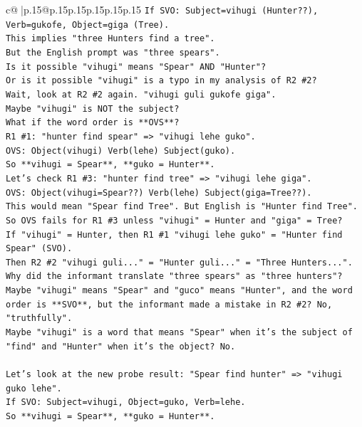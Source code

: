 \documentclass{article}
\begin{document}
{\begin{supertabular}{c@{$\;$}|p{.15\linewidth}@{}p{.15\linewidth}p{.15\linewidth}p{.15\linewidth}p{.15\linewidth}p{.15\linewidth}}
{{{\texttt{If SVO: Subject=vihugi (Hunter??), Verb=gukofe, Object=giga (Tree).} \\
\texttt{This implies "three Hunters find a tree".} \\
\texttt{But the English prompt was "three spears".} \\
\texttt{Is it possible "vihugi" means "Spear" AND "Hunter"?} \\
\texttt{Or is it possible "vihugi" is a typo in my analysis of R2 \#2?} \\
\texttt{Wait, look at R2 \#2 again. "vihugi guli gukofe giga".} \\
\texttt{Maybe "vihugi" is NOT the subject?} \\
\texttt{What if the word order is **OVS**?} \\
\texttt{R1 \#1: "hunter find spear" => "vihugi lehe guko".} \\
\texttt{OVS: Object(vihugi) Verb(lehe) Subject(guko).} \\
\texttt{So **vihugi = Spear**, **guko = Hunter**.} \\
\texttt{Let's check R1 \#3: "hunter find tree" => "vihugi lehe giga".} \\
\texttt{OVS: Object(vihugi=Spear??) Verb(lehe) Subject(giga=Tree??).} \\
\texttt{This would mean "Spear find Tree". But English is "Hunter find Tree".} \\
\texttt{So OVS fails for R1 \#3 unless "vihugi" = Hunter and "giga" = Tree?} \\
\texttt{If "vihugi" = Hunter, then R1 \#1 "vihugi lehe guko" = "Hunter find Spear" (SVO).} \\
\texttt{Then R2 \#2 "vihugi guli..." = "Hunter guli..." = "Three Hunters...".} \\
\texttt{Why did the informant translate "three spears" as "three hunters"?} \\
\texttt{Maybe "vihugi" means "Spear" and "guco" means "Hunter", and the word order is **SVO**, but the informant made a mistake in R2 \#2? No, "truthfully".} \\
\texttt{Maybe "vihugi" is a word that means "Spear" when it's the subject of "find" and "Hunter" when it's the object? No.} \\
\\ 
\texttt{Let's look at the new probe result: "Spear find hunter" => "vihugi guko lehe".} \\
\texttt{If SVO: Subject=vihugi, Object=guko, Verb=lehe.} \\
\texttt{So **vihugi = Spear**, **guko = Hunter**.} \\
}}}
\end{supertabular}}
\end{document}
